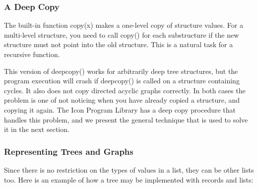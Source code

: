 \subsubsection{A Deep Copy}
The built-in function \textsf{copy(x)} makes a one-level
copy of structure values. For a multi-level structure, you need to call
\textsf{copy()} for each substructure if the new structure must not
point into the old structure. This is a natural task for
a recursive function.


This version of \textsf{deepcopy()} works for
arbitrarily deep tree structures, but the program execution
will crash if \textsf{deepcopy()} is called on a structure containing
cycles. It also does not copy directed acyclic graphs correctly. In
both cases the problem is one of not noticing when you have already
copied a structure, and copying it again. The Icon Program Library has
a deep copy procedure that handles this problem, and we present the
general technique that is used to solve it in the next section.

\subsubsection{Representing Trees and Graphs}
Since there is no restriction on the types of values in a list, they can
be other lists too. Here is an example of how a tree may be implemented
with records and lists:

